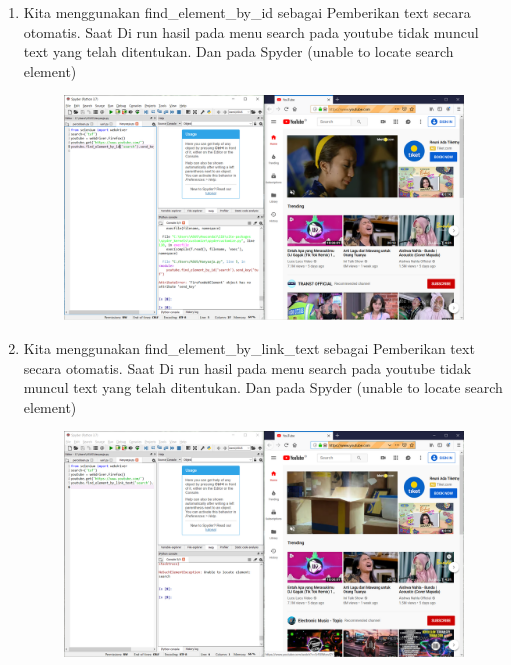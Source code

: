 \begin{enumerate}
     \item Kita menggunakan find\_element\_by\_id sebagai Pemberikan text secara otomatis. Saat  Di run hasil pada menu search pada youtube tidak muncul text yang telah ditentukan. Dan pada Spyder {(unable to locate search element)}
\begin{figure}[!htbp]
    \centering
    \includegraphics[scale=0.3]{figure/hasilTes/3.png}
    \label{gambar 1}
\end{figure}

    \item Kita menggunakan find\_element\_by\_link\_text sebagai Pemberikan text secara otomatis. Saat  Di run hasil pada menu search pada youtube tidak muncul text yang telah ditentukan. Dan pada Spyder {(unable to locate search element)}
\begin{figure}[!htbp]
    \centering
    \includegraphics[scale=0.3]{figure/hasilTes/4.png}
    \label{gambar 1}
\end{figure}


\end{enumerate}

